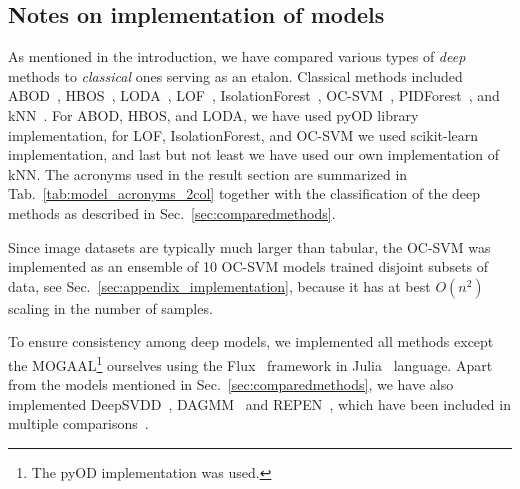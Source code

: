 \subsection{Notes on implementation of models}
As mentioned in the introduction, we have compared various types of \textit{deep} methods to \emph{classical} ones serving as an etalon. Classical methods included ABOD~\cite{kriegel2008angle}, HBOS~\cite{goldstein2012histogram}, LODA~\cite{pevny2016loda}, LOF~\cite{breunig2000lof}, IsolationForest~\cite{liu2008isolation}, OC-SVM~\cite{scholkopf2001estimating}, PIDForest~\cite{gopalanPIDForestAnomalyDetection2019}, and kNN~\cite{ramaswamy2000efficient}. For ABOD, HBOS, and LODA, we have used pyOD library~\cite{zhao2019pyod} implementation, for LOF, IsolationForest, and OC-SVM we used scikit-learn~\cite{scikit-learn} implementation, and last but not least we have used our own implementation of kNN. The acronyms used in the result section are summarized in Tab.~\ref{tab:model_acronyms_2col} together with the classification of the deep methods as described in Sec.~\ref{sec:comparedmethods}.

Since image datasets are typically much larger than tabular, the OC-SVM was implemented as an ensemble of 10 OC-SVM models trained disjoint subsets of data, see Sec.~\ref{sec:appendix_implementation}, because it has at best $O(n^2)$ scaling in the number of samples. 

To ensure consistency among deep models, we implemented all methods except the MOGAAL\footnote{The pyOD implementation was used.} ourselves using the Flux~\cite{innes:2018} framework in Julia~\cite{Julia-2017} language. Apart from the models mentioned in Sec.~\ref{sec:comparedmethods}, we have also implemented DeepSVDD~\cite{ruff2018deep}, DAGMM~\cite{zong2018deep} and REPEN~\cite{pangLearningRepresentationsUltrahighdimensional2018}, which have been included in multiple comparisons~\cite{ruff2020unifying, wang2020advae, chalapathy2018anomaly}.

